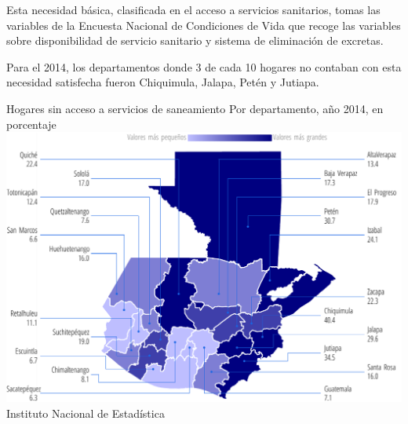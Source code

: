                     {%
Esta necesidad básica, clasificada en el acceso a servicios sanitarios, tomas las variables de la Encuesta Nacional de Condiciones de Vida que recoge las variables sobre disponibilidad de servicio sanitario y sistema de eliminación de excretas.

Para el 2014, los departamentos donde 3 de cada 10 hogares no contaban con esta necesidad satisfecha fueron Chiquimula, Jalapa, Petén y Jutiapa.   }%
                    {%
                    	Hogares sin acceso a servicios de saneamiento }
                    {%
                    	Por departamento, año 2014, en porcentaje} %
                    {%
                    	\includegraphics[width=52\cuadri]{graficas/1_15.pdf}}%
                    {%
                    	Instituto Nacional de Estadística} %

                  
                     
